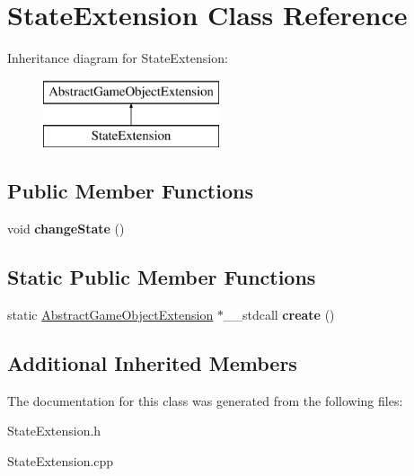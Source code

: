 \hypertarget{class_state_extension}{}\section{State\+Extension Class Reference}
\label{class_state_extension}
Inheritance diagram for State\+Extension\+:\begin{figure}[H]
\begin{center}
\leavevmode
\includegraphics[height=2.000000cm]{class_state_extension}
\end{center}
\end{figure}
\subsection*{Public Member Functions}
\begin{DoxyCompactItemize}
\item 
\mbox{\label{class_state_extension_a5560c8d941ebb9ebe875ba59e04613b2}} 
void {\bfseries change\+State} ()
\end{DoxyCompactItemize}
\subsection*{Static Public Member Functions}
\begin{DoxyCompactItemize}
\item 
\mbox{\label{class_state_extension_ae64d01bb34023a2850b7db8f3e47a265}} 
static \mbox{\hyperlink{class_abstract_game_object_extension}{Abstract\+Game\+Object\+Extension}} $\ast$\+\_\+\+\_\+stdcall {\bfseries create} ()
\end{DoxyCompactItemize}
\subsection*{Additional Inherited Members}


The documentation for this class was generated from the following files\+:\begin{DoxyCompactItemize}
\item 
State\+Extension.\+h\item 
State\+Extension.\+cpp\end{DoxyCompactItemize}
